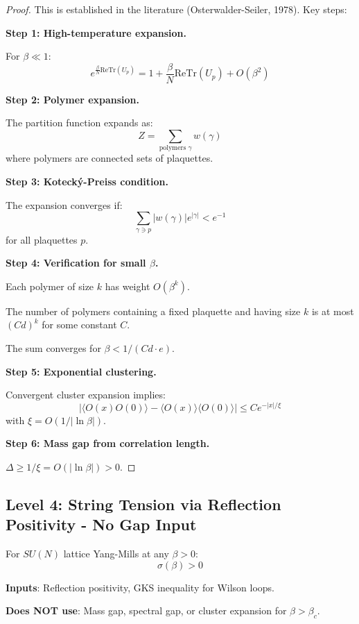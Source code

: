 \begin{proof}
This is established in the literature (Osterwalder-Seiler, 1978). Key steps:

\textbf{Step 1: High-temperature expansion.}

For $\beta \ll 1$:
\[
e^{\frac{\beta}{N}\mathrm{Re}\mathrm{Tr}(U_p)} = 1 + \frac{\beta}{N}\mathrm{Re}\mathrm{Tr}(U_p) + O(\beta^2)
\]

\textbf{Step 2: Polymer expansion.}

The partition function expands as:
\[
Z = \sum_{\text{polymers } \gamma} w(\gamma)
\]
where polymers are connected sets of plaquettes.

\textbf{Step 3: Kotecký-Preiss condition.}

The expansion converges if:
\[
\sum_{\gamma \ni p} |w(\gamma)| e^{|\gamma|} < e^{-1}
\]
for all plaquettes $p$.

\textbf{Step 4: Verification for small $\beta$.}

Each polymer of size $k$ has weight $O(\beta^k)$.

The number of polymers containing a fixed plaquette and having size $k$ is 
at most $(Cd)^k$ for some constant $C$.

The sum converges for $\beta < 1/(Cd \cdot e)$.

\textbf{Step 5: Exponential clustering.}

Convergent cluster expansion implies:
\[
|\langle O(x) O(0) \rangle - \langle O(x) \rangle \langle O(0) \rangle| \leq C e^{-|x|/\xi}
\]
with $\xi = O(1/|\ln\beta|)$.

\textbf{Step 6: Mass gap from correlation length.}

$\Delta \geq 1/\xi = O(|\ln\beta|) > 0$.
\end{proof}

\subsection{Level 4: String Tension via Reflection Positivity - No Gap Input}

\begin{theorem}
\label{thm:string-tension-no-gap}
For $SU(N)$ lattice Yang-Mills at any $\beta > 0$:
\[
\sigma(\beta) > 0
\]

\textbf{Inputs}: Reflection positivity, GKS inequality for Wilson loops.

\textbf{Does NOT use}: Mass gap, spectral gap, or cluster expansion for $\beta > \beta_c$.
\end{theorem}

